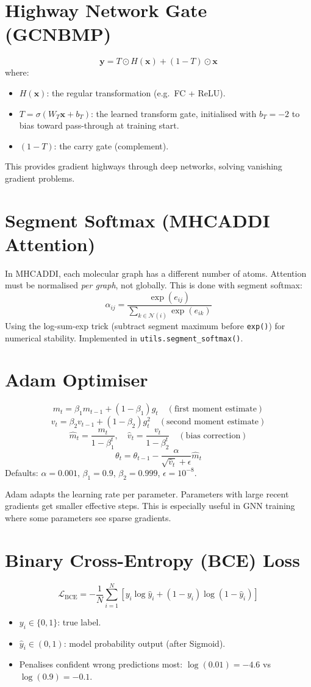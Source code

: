 \documentclass[12pt,a4paper,oneside]{book}
\begin{document}
\section{Highway Network Gate (GCNBMP)}
\[\mathbf{y} = T \odot H(\mathbf{x}) + (1-T) \odot \mathbf{x}\]
where:
\begin{itemize}
  \item $H(\mathbf{x})$: the regular transformation (e.g.\ FC + ReLU).
  \item $T = \sigma(W_T \mathbf{x} + b_T)$: the learned transform gate, initialised with $b_T=-2$ to bias toward pass-through at training start.
  \item $(1-T)$: the carry gate (complement).
\end{itemize}
This provides gradient highways through deep networks, solving vanishing gradient problems.

\section{Segment Softmax (MHCADDI Attention)}
In MHCADDI, each molecular graph has a different number of atoms. Attention must be normalised \textit{per graph}, not globally. This is done with segment softmax:
\[\alpha_{ij} = \frac{\exp(e_{ij})}{\sum_{k \in \mathcal{N}(i)} \exp(e_{ik})}\]
Using the log-sum-exp trick (subtract segment maximum before \texttt{exp()}) for numerical stability. Implemented in \texttt{utils.segment\_softmax()}.

\section{Adam Optimiser}
\[m_t = \beta_1 m_{t-1} + (1-\beta_1)g_t \quad (\text{first moment estimate})\]
\[v_t = \beta_2 v_{t-1} + (1-\beta_2)g_t^2 \quad (\text{second moment estimate})\]
\[\hat{m}_t = \frac{m_t}{1-\beta_1^t}, \quad \hat{v}_t = \frac{v_t}{1-\beta_2^t} \quad (\text{bias correction})\]
\[\theta_t = \theta_{t-1} - \frac{\alpha}{\sqrt{\hat{v}_t}+\epsilon}\hat{m}_t\]
Defaults: $\alpha=0.001$, $\beta_1=0.9$, $\beta_2=0.999$, $\epsilon=10^{-8}$.

Adam adapts the learning rate per parameter. Parameters with large recent gradients get smaller effective steps. This is especially useful in GNN training where some parameters see sparse gradients.

\section{Binary Cross-Entropy (BCE) Loss}
\[\mathcal{L}_{\mathrm{BCE}} = -\frac{1}{N}\sum_{i=1}^N\left[y_i\log\hat{y}_i + (1-y_i)\log(1-\hat{y}_i)\right]\]
\begin{itemize}
  \item $y_i \in \{0,1\}$: true label.
  \item $\hat{y}_i \in (0,1)$: model probability output (after Sigmoid).
  \item Penalises confident wrong predictions most: $\log(0.01) = -4.6$ vs $\log(0.9) = -0.1$.
\end{itemize}
\end{document}
